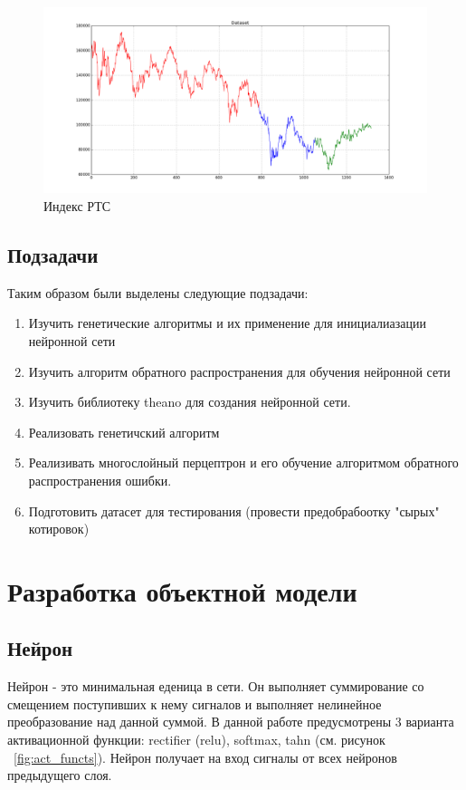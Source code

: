 \documentclass[a4paper,12pt]{article}
\begin{document}
\begin{center}
	\begin{figure}[h]
		\centering
   		\includegraphics[scale=0.42]{img/rts.png}
   		\caption{Индекс РТС}
   		\label{fig:rts}
    \end{figure}
\end{center}

\subsection{Подзадачи}

\par Таким образом были выделены следующие подзадачи:
\begin{enumerate}
\item Изучить генетические алгоритмы и их применение для инициалиазации нейронной сети
\item Изучить алгоритм обратного распространения для обучения нейронной сети
\item Изучить библиотеку theano для создания нейронной сети.
\item Реализовать генетичский алгоритм
\item Реализивать многослойный перцептрон и его обучение алгоритмом обратного распространения ошибки.
\item Подготовить датасет для тестирования (провести предобрабоотку "сырых" котировок)
\end{enumerate}

\newpage\section{Разработка объектной модели}

\subsection{Нейрон}
Нейрон - это минимальная еденица в сети. Он выполняет суммирование со смещением поступивших к нему сигналов и выполняет нелинейное преобразование над данной суммой. В данной работе предусмотрены 3 варианта активационной функции: rectifier (relu), softmax, tahn (см. рисунок ~\ref{fig:act_functs}). Нейрон получает на вход сигналы от всех нейронов предыдущего слоя.
\end{document}
